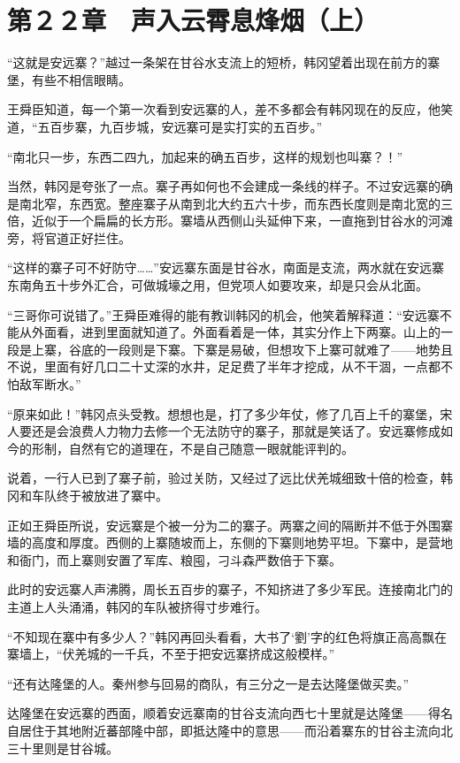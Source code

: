 \section{第２２章　声入云霄息烽烟（上）}

“这就是安远寨？”越过一条架在甘谷水支流上的短桥，韩冈望着出现在前方的寨堡，有些不相信眼睛。

王舜臣知道，每一个第一次看到安远寨的人，差不多都会有韩冈现在的反应，他笑道，“五百步寨，九百步城，安远寨可是实打实的五百步。”

“南北只一步，东西二四九，加起来的确五百步，这样的规划也叫寨？！”

当然，韩冈是夸张了一点。寨子再如何也不会建成一条线的样子。不过安远寨的确是南北窄，东西宽。整座寨子从南到北大约五六十步，而东西长度则是南北宽的三倍，近似于一个扁扁的长方形。寨墙从西侧山头延伸下来，一直拖到甘谷水的河滩旁，将官道正好拦住。

“这样的寨子可不好防守……”安远寨东面是甘谷水，南面是支流，两水就在安远寨东南角五十步外汇合，可做城壕之用，但党项人如要攻来，却是只会从北面。

“三哥你可说错了。”王舜臣难得的能有教训韩冈的机会，他笑着解释道：“安远寨不能从外面看，进到里面就知道了。外面看着是一体，其实分作上下两寨。山上的一段是上寨，谷底的一段则是下寨。下寨是易破，但想攻下上寨可就难了——地势且不说，里面有好几口二十丈深的水井，足足费了半年才挖成，从不干涸，一点都不怕敌军断水。”

“原来如此！”韩冈点头受教。想想也是，打了多少年仗，修了几百上千的寨堡，宋人要还是会浪费人力物力去修一个无法防守的寨子，那就是笑话了。安远寨修成如今的形制，自然有它的道理在，不是自己随意一眼就能评判的。

说着，一行人已到了寨子前，验过关防，又经过了远比伏羌城细致十倍的检查，韩冈和车队终于被放进了寨中。

正如王舜臣所说，安远寨是个被一分为二的寨子。两寨之间的隔断并不低于外围寨墙的高度和厚度。西侧的上寨随坡而上，东侧的下寨则地势平坦。下寨中，是营地和衙门，而上寨则安置了军库、粮囤，刁斗森严数倍于下寨。

此时的安远寨人声沸腾，周长五百步的寨子，不知挤进了多少军民。连接南北门的主道上人头涌涌，韩冈的车队被挤得寸步难行。

“不知现在寨中有多少人？”韩冈再回头看看，大书了‘劉’字的红色将旗正高高飘在寨墙上，“伏羌城的一千兵，不至于把安远寨挤成这般模样。”

“还有达隆堡的人。秦州参与回易的商队，有三分之一是去达隆堡做买卖。”

达隆堡在安远寨的西面，顺着安远寨南的甘谷支流向西七十里就是达隆堡——得名自居住于其地附近蕃部隆中部，即抵达隆中的意思——而沿着寨东的甘谷主流向北三十里则是甘谷城。


